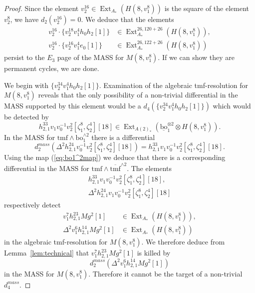 \documentclass[10pt]{amsart}
\newcommand{\ul}[1]{\underline{#1}}
\newcommand{\br}[1]{\overline{#1}}
\newcommand{\tmf}{\mathrm{tmf}}
\newcommand{\bo}{\mathrm{bo}}
\newcommand{\bou}{\ul{\bo}}
\theoremstyle{definition}
\numberwithin{equation}{section}
\numberwithin{figure}{section}
\DeclareMathOperator{\Ext}{Ext}
\begin{document}
\begin{proof}
Since the element $v_2^{16} \in \Ext_{A_*}(H(8,v_1^8))$ is the square of the element $v_2^8$, we have $d_2(v_2^{16}) = 0$.  
We deduce that the elements
\begin{align*} 
v_2^{16}\cdot \{v_2^{18}v_1^4h_0h_2[1]\} & \in \Ext^{26,120+26}_{A_*}(H(8,v_1^8)), \\
v_2^{16}\cdot\{v_2^{16}v_1^4e_0[1]\} & \in \Ext^{26,122+26}_{A_*}(H(8,v_1^8)) 
\end{align*} 
persist to the $E_3$ page of the MASS for $M(8,v_1^8)$.  If we can show they are permanent cycles, we are done.

We begin with $\{v_2^{34}v_1^4h_0h_2[1]\}$.
Examination of the algebraic tmf-resolution for $M(8,v_1^8)$ reveals that the only possibility of a non-trivial differential in the MASS supported by this element would be a $d_4(\{v_2^{34} v_1^4h_0h_2[1]\})$ which would be detected by 
$$ h_{2,1}^{33}v_1v_0^{-1}v_2^2[\zeta_1^8,\zeta_2^4][18] \in \Ext_{A(2)_*}(\bou_1^{\otimes 2} \otimes H(8,v_1^8)). $$
In the MASS for $\tmf \wedge \bo_1^{\wedge 2}$ there is a differential
$$ d_2^{mass}(\Delta^2 h_{2,1}^{24} v_0^{-1}v_2^2[\zeta_1^8,\zeta_2^4][18]) = 
h_{2,1}^{33}v_1 v_0^{-1}v_2^2[\zeta_1^8,\zeta_2^4][18]. $$ 
Using the map (\ref{eq:bo1^2map}) we deduce that there is a corresponding differential in the MASS for $\tmf \wedge \br{\tmf}^{\wedge 2}$.  
The elements 
\begin{gather*}
h_{2,1}^{33}v_1v_0^{-1}v_2^2[\zeta_1^8,\zeta_2^4][18], \\
\Delta^2 h_{2,1}^{24}v_1v_0^{-1}v_2^2[\zeta_1^8,\zeta_2^4][18]
\end{gather*}
respectively detect 
\begin{align*}
 v_1^7 h_{2,1}^{23} Mg^2[1] & \in \Ext_{A_*}(H(8,v_1^8)), \\
 \Delta^2 v_1^6 h_{2,1}^{14} Mg^2 [1] & \in \Ext_{A_*}(H(8,v_1^8)) 
\end{align*}
in the algebraic tmf-resolution for  $M(8,v_1^8)$.
We therefore deduce from Lemma~\ref{lem:technical} that $v_1^7 h_{2,1}^{23} Mg^2[1]$ is killed by 
$$ d^{mass}_2 (\Delta^2 v_1^6 h_{2,1}^{14} Mg^2[1]) $$
in the MASS for $M(8,v_1^8)$.
Therefore it cannot be the target of a non-trivial $d^{mass}_4$.


\end{proof}
\end{document}
